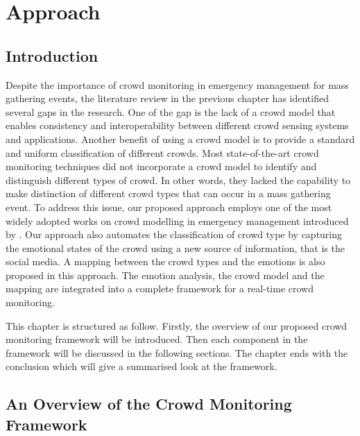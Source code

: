 \chapter{Approach}
\label{ch:approach}
\ifpdf
\graphicspath{{Chapter3/Figs/Raster/}{Chapter3/Figs/PDF/}{Chapter3/Figs/}}
\else
\graphicspath{{Chapter3/Figs/Vector/}{Chapter3/Figs/}}
\fi

\section{Introduction}
\label{sec:approachIntro}
Despite the importance of crowd monitoring in emergency management for mass gathering events, the literature review in the previous chapter has identified several gaps in the research. One of the gap is the lack of a crowd model that enables consistency and interoperability between different crowd sensing systems and applications. Another benefit of using a crowd model is to provide a standard and uniform classification of different crowds. Most state-of-the-art crowd monitoring techniques did not incorporate a crowd model to identify and distinguish different types of crowd. In other words, they lacked the capability to make distinction of different crowd types that can occur in a mass gathering event. To address this issue, our proposed approach employs one of the most widely adopted works on crowd modelling in emergency management introduced by \citet{Berlonghi1995}. Our approach also automates the classification of crowd type by capturing the emotional states of the crowd using a new source of information, that is the social media. A mapping between the crowd types and the emotions is also proposed in this approach. The emotion analysis, the crowd model and the mapping are integrated into a complete framework for a real-time crowd monitoring.

This chapter is structured as follow. Firstly, the overview of our proposed crowd monitoring framework will be introduced. Then each component in the framework will be discussed in the following sections. The chapter ends with the conclusion which will give a summarised look at the framework.

\section{An Overview of the Crowd Monitoring Framework}

